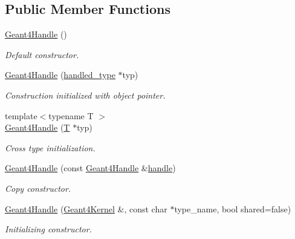 \subsection*{Public Member Functions}
\begin{DoxyCompactItemize}
\item 
\hyperlink{class_d_d4hep_1_1_simulation_1_1_geant4_handle_a0c81dba8f012c42cf56aa9de145ceba7}{Geant4\+Handle} ()
\begin{DoxyCompactList}\small\item\em Default constructor. \end{DoxyCompactList}\item 
\hyperlink{class_d_d4hep_1_1_simulation_1_1_geant4_handle_a82201301931f3fc74f9ad0c4fe6b9071}{Geant4\+Handle} (\hyperlink{class_d_d4hep_1_1_simulation_1_1_geant4_handle_a35e583b9228e38c95d23112ad19b645d}{handled\+\_\+type} $\ast$typ)
\begin{DoxyCompactList}\small\item\em Construction initialized with object pointer. \end{DoxyCompactList}\item 
{\footnotesize template$<$typename T $>$ }\\\hyperlink{class_d_d4hep_1_1_simulation_1_1_geant4_handle_a6a8897eeec383f6599c6f08f607dace5}{Geant4\+Handle} (\hyperlink{class_t}{T} $\ast$typ)
\begin{DoxyCompactList}\small\item\em Cross type initialization. \end{DoxyCompactList}\item 
\hyperlink{class_d_d4hep_1_1_simulation_1_1_geant4_handle_a285188049a0dfb7e4129c2ba4556c105}{Geant4\+Handle} (const \hyperlink{class_d_d4hep_1_1_simulation_1_1_geant4_handle}{Geant4\+Handle} \&\hyperlink{_geant4_converter_8cpp_a3789cd8800e1433fb917a1d6f85ef67d}{handle})
\begin{DoxyCompactList}\small\item\em Copy constructor. \end{DoxyCompactList}\item 
\hyperlink{class_d_d4hep_1_1_simulation_1_1_geant4_handle_a765cd4c227a41d33781599c71fc11e51}{Geant4\+Handle} (\hyperlink{class_d_d4hep_1_1_simulation_1_1_geant4_kernel}{Geant4\+Kernel} \&, const char $\ast$type\+\_\+name, bool shared=false)
\begin{DoxyCompactList}\small\item\em Initializing constructor. \end{DoxyCompactList}\item 

\end{DoxyCompactItemize}

